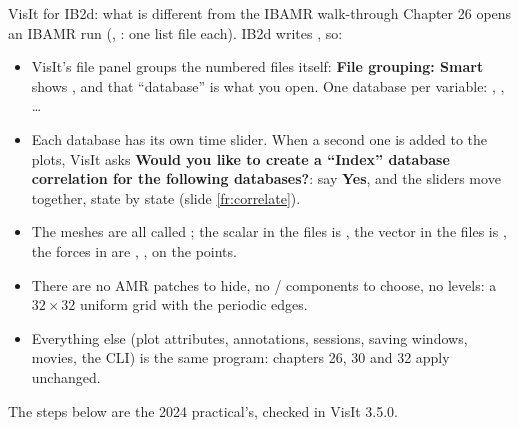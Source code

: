 \documentclass[aspectratio=169,11pt]{beamer}
\newcommand{\gui}[1]{\textsf{\textbf{#1}}}
\begin{document}
\begin{frame}{VisIt for IB2d: what is different from the IBAMR walk-through}
\label{fr:diff}
\small
Chapter 26 opens an IBAMR run (, : one list file each). IB2d writes , so:
\begin{itemize}
  \item VisIt's file panel groups the numbered files itself: \gui{File grouping: Smart} shows , and that ``database'' is what you open. One database per variable: , , \ldots
  \item Each database has its own time slider. When a second one is added to the plots, VisIt asks \gui{Would you like to create a ``Index'' database correlation for the following databases?}: say \gui{Yes}, and the sliders move together, state by state (slide \ref{fr:correlate}).
  \item The meshes are all called ; the scalar in the  files is , the vector in the  files is , the forces in  are , ,  on the points.
  \item There are no AMR patches to hide, no / components to choose, no levels: a $32 \times 32$ uniform grid with the periodic edges.
  \item Everything else (plot attributes, annotations, sessions, saving windows, movies, the CLI) is the same program: chapters 26, 30 and 32 apply unchanged.
\end{itemize}
The steps below are the 2024 practical's, checked in VisIt 3.5.0.
\end{frame}
\end{document}
